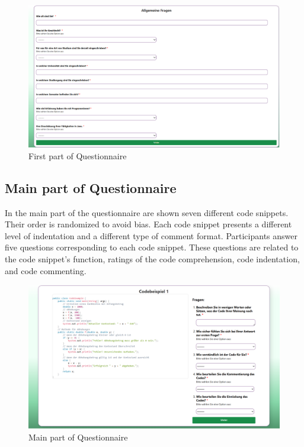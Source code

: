 \begin{figure} [H]
  \centering
  \includegraphics[scale=0.45]{figures/allgemein.png}
  \caption{First part of Questionnaire}
  \label{fig:AnhangsChor}
\end{figure}


\subsection{Main part of Questionnaire}

In the main part of the questionnaire are shown seven different code snippets. Their order is randomized to avoid bias. Each code snippet presents a different level of indentation and a different type of comment format.
Participants answer five questions corresponding to each code snippet. These questions are related to the code snippet’s function, ratings of the code comprehension, code indentation, and code commenting.


\begin{figure} [H]
  \centering
  \includegraphics[scale=0.45]{figures/main_p.png}
  \caption{Main part of Questionnaire}
  \label{fig:AnhangsChor}
\end{figure}



